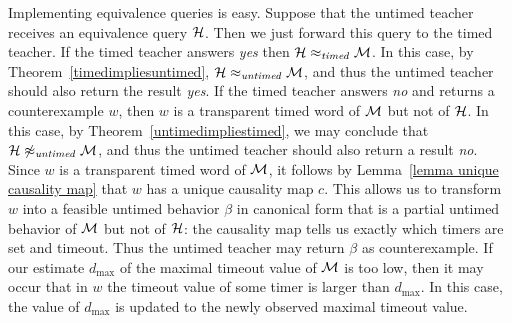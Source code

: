 Implementing equivalence queries is easy.
Suppose that the untimed teacher receives an equivalence query ${\mathcal H}$.
Then we just forward this query to the timed teacher.
If the timed teacher answers \emph{yes} then ${\mathcal H} \approx_{\mathit{timed}} {\mathcal M}$.
In this case, by Theorem~\ref{timedimpliesuntimed}, ${\mathcal H} \approx_{\mathit{untimed}} {\mathcal M}$,
and thus the untimed teacher should also return the result \emph{yes}.
If the timed teacher answers \emph{no} and returns a counterexample $w$,
then $w$ is a transparent timed word of ${\mathcal M}$ but not of ${\mathcal H}$.
In this case, by Theorem~\ref{untimedimpliestimed}, we may conclude that
${\mathcal H} \not\approx_{\mathit{untimed}} {\mathcal M}$, and thus the untimed teacher should also return a result \emph{no}.
Since $w$ is a transparent timed word of ${\mathcal M}$, it 
follows 
\iflong
by Lemma~\ref{lemma unique causality map} 
\fi
that $w$ 
has a unique causality map $c$.
This allows us to transform $w$ into a feasible untimed behavior $\beta$ in canonical form that is a partial untimed
behavior of ${\mathcal M}$ but not of ${\mathcal H}$: the causality map tells us exactly which timers are set and timeout. 
Thus the untimed teacher may return $\beta$ as counterexample.
If our estimate $d_{\max}$ of the maximal timeout value of ${\mathcal M}$ is too low, then it may occur that in $w$ the timeout value of some
timer is larger than $d_{\max}$. In this case, the value of $d_{\max}$ is updated to the newly observed maximal timeout value.





